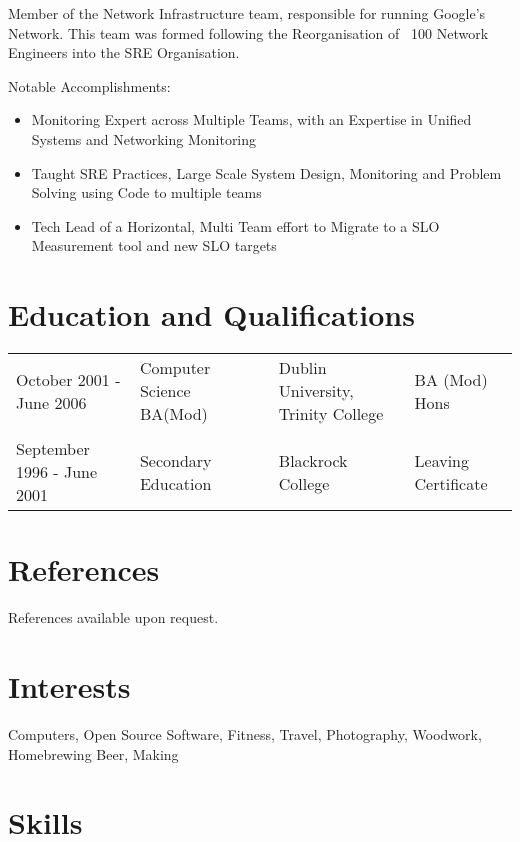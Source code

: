 \documentclass[a4paper, 11pt] {article}
\begin{document}
Member of the Network Infrastructure team, responsible for running Google's Network. This team was formed
following the Reorganisation of ~100 Network Engineers into the SRE Organisation.


Notable Accomplishments:

\begin{itemize}
  \item Monitoring Expert across Multiple Teams, with an Expertise in Unified Systems and Networking Monitoring
  \item Taught SRE Practices, Large Scale System Design, Monitoring and Problem Solving using Code to multiple teams
  \item Tech Lead of a Horizontal, Multi Team effort to Migrate to a SLO Measurement tool and new SLO targets
\end{itemize}

\section*{Education and Qualifications}

\begin{tabular}{l l l l l}
October 2001 - June 2006 	& Computer Science BA(Mod) &	& Dublin University, Trinity College & BA (Mod) Hons \\
			 	&			   &	&				     &		     \\
September 1996 - June 2001	& Secondary Education	   &	& Blackrock College	& Leaving Certificate	     \\
\end{tabular}

\section*{References}

References available upon request.

\pagebreak

\section*{Interests}

Computers, Open Source Software, Fitness, Travel, Photography, Woodwork, Homebrewing Beer, Making

\section*{Skills}
\end{document}
